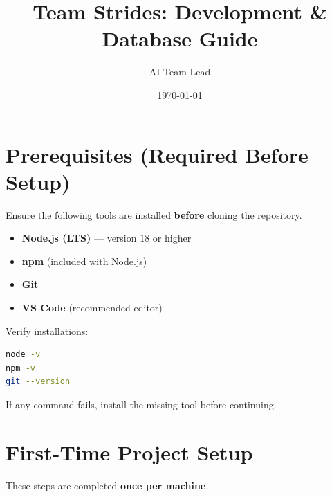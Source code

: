 \documentclass[11pt]{article}
\title{\textbf{Team Strides: Development \& Database Guide}}
\author{AI Team Lead}
\date{\today}
\begin{document}
\maketitle

\section{Prerequisites (Required Before Setup)}

Ensure the following tools are installed \textbf{before} cloning the repository.

\begin{itemize}
    \item \textbf{Node.js (LTS)} — version 18 or higher
    \item \textbf{npm} (included with Node.js)
    \item \textbf{Git}
    \item \textbf{VS Code} (recommended editor)
\end{itemize}

Verify installations:
\begin{lstlisting}[language=bash]
node -v
npm -v
git --version
\end{lstlisting}

If any command fails, install the missing tool before continuing.

\section{First-Time Project Setup}

These steps are completed \textbf{once per machine}.
\end{document}
